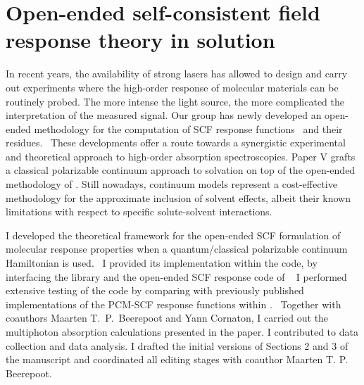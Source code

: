 \section{Open-ended self-consistent field response theory in
solution}\label{sec:pcmopenrsp}

In recent years, the availability of strong lasers has allowed to
design and carry out experiments where the high-order response of
molecular materials can be routinely probed.
The more intense the light source, the more complicated the interpretation of
the measured signal.
Our group has newly developed an open-ended methodology for the computation of
\acs{SCF} response functions~\autocite{Thorvaldsen2008-sg, Ringholm2014-gx} and
their residues.~\autocite{Friese2015-kb}
These developments offer a route towards a synergistic experimental and
theoretical approach to high-order absorption spectroscopies.
Paper V grafts a classical polarizable continuum approach to solvation on top
of the open-ended methodology of \citeauthor{Thorvaldsen2008-sg}.
Still nowadays, continuum models represent a cost-effective methodology for the
approximate inclusion of solvent effects, albeit their known limitations with respect
to specific solute-solvent interactions.

I developed the theoretical framework for the open-ended \acs{SCF} formulation
of molecular response properties when a quantum/classical polarizable continuum
Hamiltonian is used.~\autocite{Thorvaldsen2008-sg, Lipparini2010-be}
I provided its implementation within the \DALTON code, by interfacing the
\pcmsolver library and the open-ended \acs{SCF} response code of
\citeauthor{Ringholm2014-gx}~\autocite{Ringholm2014-gx, Friese2015-kb}
I performed extensive testing of the code by comparing with previously
published implementations of the \acs{PCM}-\acs{SCF} response functions within
\DALTON.~\autocite{Cammi2003-qy, Frediani2005-nc, Ferrighi2010-pm}
Together with coauthors Maarten T.~P.~Beerepoot and Yann Cornaton, I carried out
the multiphoton absorption calculations presented in the paper. I contributed
to data collection and data analysis.
I drafted the initial versions of Sections 2 and 3 of the manuscript and coordinated all
editing stages with coauthor Maarten T. P. Beerepoot.
